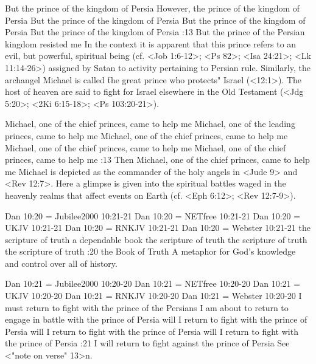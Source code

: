    {But the prince of the kingdom of Persia} %
    {However, the prince of the kingdom of Persia} %
    {But the prince of the kingdom of Persia} %
    {But the prince of the kingdom of Persia} %
    {But the prince of the kingdom of Persia} %
:13 {But the prince of the Persian kingdom resisted me} 
In the context it is apparent that this prince refers to an evil, but powerful, spiritual being (cf. <Job 1:6-12>; <Ps 82>; <Isa 24:21>; <Lk 11:14-26>)   
assigned by Satan to activity pertaining to Persian rule. 
Similarly, the archangel Michael is called \"the great prince who protects" Israel (<12:1>). 
The host of heaven are said to fight for Israel elsewhere in the Old Testament (<Jdg 5:20>; <2Ki 6:15-18>; <Ps 103:20-21>).


    {Michael, one of the chief princes, came to help me} %
    {Michael, one of the leading princes, came to help me} %
    {Michael, one of the chief princes, came to help me} %
    {Michael, one of the chief princes, came to help me} %
    {Michael, one of the chief princes, came to help me} %
:13  {Then Michael, one of the chief princes, came to help me} 
Michael is depicted as the commander of the holy angels in <Jude 9> and <Rev 12:7>. 
Here a glimpse is given into the spiritual battles waged in the heavenly realms that affect events on Earth (cf. <Eph 6:12>; <Rev 12:7-9>).




\renum Dan 10:20 = Jubilee2000 10:21-21
\renum Dan 10:20 = NETfree 10:21-21
\renum Dan 10:20 = UKJV 10:21-21
\renum Dan 10:20 = RNKJV 10:21-21
\renum Dan 10:20 = Webster 10:21-21
    {the scripture of truth} %
    {a dependable book} %
    {the scripture of truth} %
    {the scripture of truth} %
    {the scripture of truth} %
:20 {the Book of Truth} A metaphor for God's knowledge and control over all of history.



\renum Dan 10:21 = Jubilee2000 10:20-20
\renum Dan 10:21 = NETfree 10:20-20
\renum Dan 10:21 = UKJV 10:20-20
\renum Dan 10:21 = RNKJV 10:20-20
\renum Dan 10:21 = Webster 10:20-20
    {I must return to fight with the prince of the Persians} %
    {I am about to return to engage in battle with the prince of Persia} %
    {will I return to fight with the prince of Persia} %
    {will I return to fight with the prince of Persia} %
    {will I return to fight with the prince of Persia} %
:21 {I will return to fight against the prince of Persia} See <"note on verse" 13>n.


